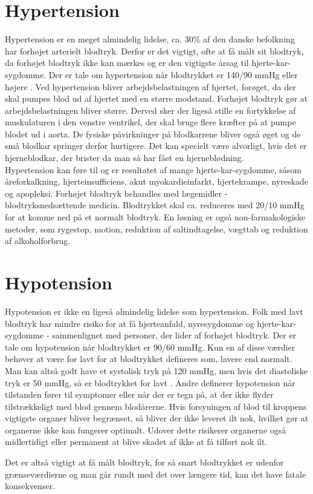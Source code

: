 \section{Hypertension} 
Hypertension er en meget almindelig lidelse, ca. 30\% af den danske befolkning har forhøjet arterielt blodtryk. Derfor er det vigtigt, ofte at få målt sit blodtryk, da forhøjet blodtryk ikke kan mærkes og er den vigtigste årsag til hjerte-kar-sygdomme. 
Der er tale om hypertension når blodtrykket er 140/90 mmHg eller højere \cite{Hypertension}.
Ved hypertension bliver arbejdsbelastningen af hjertet, forøget, da der skal pumpes blod ud af hjertet med en større modstand.
Forhøjet blodtryk gør at arbejdsbelastningen bliver større. Derved sker der ligeså stille en fortykkelse af muskulaturen i den venstre ventrikel, der skal bruge flere kræfter på at pumpe blodet ud i aorta. 
De fysiske påvirkninger på blodkarrene bliver også øget og de små blodkar springer derfor hurtigere. Det kan specielt være alvorligt, hvis det er hjerneblodkar, der brister da man så har fået en hjerneblødning. \\
Hypertension kan føre til og er resultatet af mange hjerte-kar-sygdomme, såsom åreforkalkning, hjerteinsufficiens, akut myokardieinfarkt, hjertekrampe, nyreskade og apopleksi.
Forhøjet blodtryk behandles med lægemidler - blodtryksnedsættende medicin. Blodtrykket skal ca. reduceres med 20/10 mmHg for at komme ned på et normalt blodtryk. En løsning er også non-farmakologiske metoder, som rygestop, motion, reduktion af saltindtagelse, vægttab og reduktion af alkoholforbrug. 

\section{Hypotension} 
Hypotension er ikke en ligeså almindelig lidelse som hypertension. Folk med lavt blodtryk har mindre risiko for at få hjerteanfald, nyresygdomme og hjerte-kar-sygdomme - sammenlignet med personer, der lider af forhøjet blodtryk.
Der er tale om hypotension når blodtrykket er 90/60 mmHg. Kun en af disse værdier behøver at være for lavt for at blodtrykket defineres som, lavere end normalt. Man kan altså godt have et systolisk tryk på 120 mmHg, men hvis det diastoliske tryk er 50 mmHg, så er blodtrykket for lavt \cite{Hypotension}.  
Andre definerer hypotension når tilstanden fører til symptomer eller når der er tegn på, at der ikke flyder tilstrækkeligt med blod gennem blodårerne. Hvis forsyningen af blod til kroppens vigtigste organer bliver begrænset, så bliver der ikke leveret ilt nok, hvilket gør at organerne ikke kan fungerer optimalt. Udover dette risikerer organerne også midlertidigt eller permanent at blive skadet af ikke at få tilført nok ilt. 

Det er altså vigtigt at få målt blodtryk, for så snart blodtrykket er udenfor grænseværdierne og man går rundt med det over længere tid, kan det have fatale konsekvenser.   